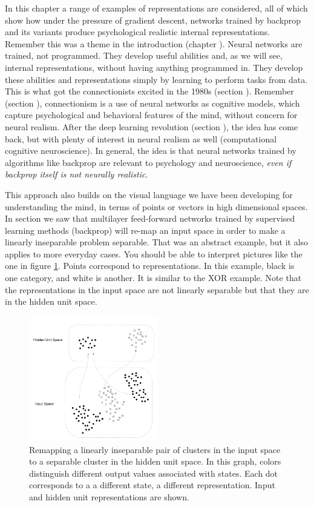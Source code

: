 In this chapter a range of examples of representations are considered, all of which show how under the pressure of gradient descent, networks trained by backprop and its variants produce psychological realistic internal representations. Remember this was a theme in the introduction (chapter ). Neural networks are trained, not programmed. They develop useful abilities and, as we will see, internal representations, without having anything programmed in. They develop these abilities and representations simply by learning to perform tasks from data. This is what got the connectionists excited in the 1980s (section ). Remember (section ), connectionism is a use of neural networks as cognitive models, which capture psychological and behavioral features of the mind, without concern for neural realism. After the deep learning revolution (section ), the idea has come back, but with plenty of interest in neural realism as well (computational cognitive neuroscience).  In general, the idea is that neural networks trained by algorithms like backprop are relevant to psychology and neuroscience, \emph{even if backprop itself is not neurally realistic}.

This approach also builds on the visual language we have been developing for understanding the mind, in terms of points or vectors in high dimensional spaces. In section  we saw that multilayer feed-forward networks trained by supervised learning methods (\eg backprop) will re-map an input space in order to make a linearly inseparable problem separable. That was an abstract example, but it also applies to more everyday cases. You should be able to interpret pictures like the one in figure \ref{remappingClusters}.  Points correspond to representations. In this example, black is one category, and white is another. It is similar to the XOR example.  Note that the representations in the input space are not linearly separable but that they are in the hidden unit space.
\begin{figure}[h]
\centering
\includegraphics[width=0.5\textwidth]{images/remappingClusters}
\caption[Jeff Yoshimi.]{Remapping a linearly inseparable pair of clusters in the input space to a separable cluster in the hidden unit space. In this graph, colors distinguish different output values associated with states. Each dot corresponds to a a different state, a different representation. Input and hidden unit representations are shown.}
\label{remappingClusters}
\end{figure}

